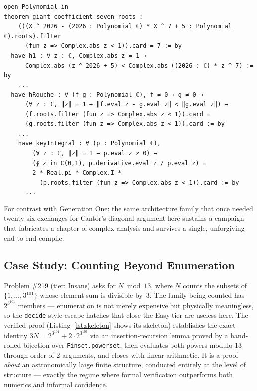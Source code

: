 \documentclass[12pt, a4paper]{article}
\begin{document}
\begin{lstlisting}[caption={Problem \#220 --- statement and pivotal internal steps of the 354-line verified script (excerpt).},label={lst:rouche}]
open Polynomial in
theorem giant_coefficient_seven_roots :
    (((X ^ 2026 - (2026 : Polynomial ℂ) * X ^ 7 + 5 : Polynomial ℂ).roots).filter
      (fun z => Complex.abs z < 1)).card = 7 := by
  have h1 : ∀ z : ℂ, Complex.abs z = 1 →
      Complex.abs (z ^ 2026 + 5) < Complex.abs ((2026 : ℂ) * z ^ 7) := by
    ...
  have hRouche : ∀ (f g : Polynomial ℂ), f ≠ 0 → g ≠ 0 →
      (∀ z : ℂ, ‖z‖ = 1 → ‖f.eval z - g.eval z‖ < ‖g.eval z‖) →
      (f.roots.filter (fun z => Complex.abs z < 1)).card =
      (g.roots.filter (fun z => Complex.abs z < 1)).card := by
    ...
    have keyIntegral : ∀ (p : Polynomial ℂ),
        (∀ z : ℂ, ‖z‖ = 1 → p.eval z ≠ 0) →
        (∮ z in C(0,1), p.derivative.eval z / p.eval z) =
        2 * Real.pi * Complex.I *
          (p.roots.filter (fun z => Complex.abs z < 1)).card := by
      ...
\end{lstlisting}

For contrast with Generation One: the same architecture family that once
needed twenty-six exchanges for Cantor's diagonal argument here sustains a
campaign that fabricates a chapter of complex analysis and survives a
single, unforgiving end-to-end compile.

\subsection{Case Study: Counting Beyond Enumeration}

Problem \#219 (tier: Insane) asks for $N \bmod 13$, where $N$ counts the
subsets of $\{1, \dots, 3^{101}\}$ whose element sum is divisible by~3. The
family being counted has $2^{3^{101}}$ members --- enumeration is not merely
expensive but physically meaningless, so the \texttt{decide}-style escape
hatches that close the Easy tier are useless here. The verified proof
(Listing~\ref{lst:skeleton} shows its skeleton) establishes the exact
identity $3N = 2^{3^{101}} + 2 \cdot 2^{3^{100}}$ via an insertion-recursion
lemma proved by a hand-rolled bijection over \texttt{Finset.powerset}, then
evaluates both powers modulo 13 through order-of-2 arguments, and closes
with linear arithmetic. It is a proof \emph{about} an astronomically large
finite structure, conducted entirely at the level of structure --- exactly
the regime where formal verification outperforms both numerics and informal
confidence.
\end{document}
